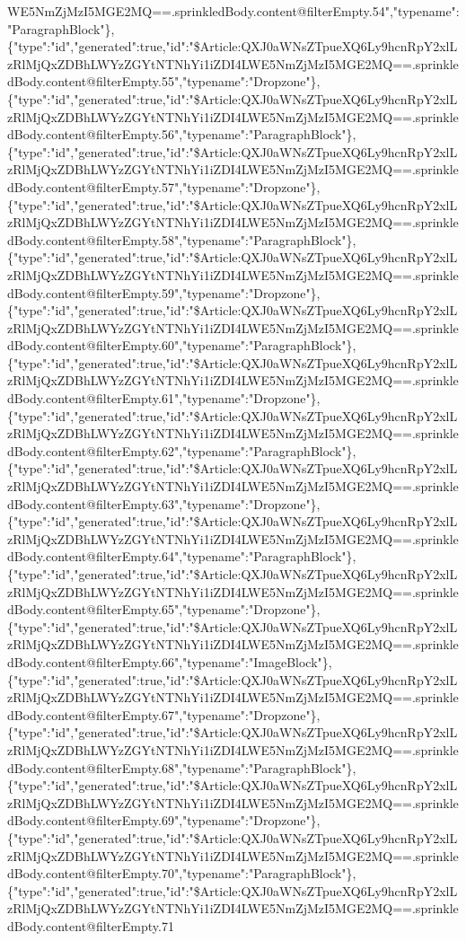 WE5NmZjMzI5MGE2MQ==.sprinkledBody.content@filterEmpty.54","typename":"ParagraphBlock"\},\{"type":"id","generated":true,"id":"\$Article:QXJ0aWNsZTpueXQ6Ly9hcnRpY2xlLzRlMjQxZDBhLWYzZGYtNTNhYi1iZDI4LWE5NmZjMzI5MGE2MQ==.sprinkledBody.content@filterEmpty.55","typename":"Dropzone"\},\{"type":"id","generated":true,"id":"\$Article:QXJ0aWNsZTpueXQ6Ly9hcnRpY2xlLzRlMjQxZDBhLWYzZGYtNTNhYi1iZDI4LWE5NmZjMzI5MGE2MQ==.sprinkledBody.content@filterEmpty.56","typename":"ParagraphBlock"\},\{"type":"id","generated":true,"id":"\$Article:QXJ0aWNsZTpueXQ6Ly9hcnRpY2xlLzRlMjQxZDBhLWYzZGYtNTNhYi1iZDI4LWE5NmZjMzI5MGE2MQ==.sprinkledBody.content@filterEmpty.57","typename":"Dropzone"\},\{"type":"id","generated":true,"id":"\$Article:QXJ0aWNsZTpueXQ6Ly9hcnRpY2xlLzRlMjQxZDBhLWYzZGYtNTNhYi1iZDI4LWE5NmZjMzI5MGE2MQ==.sprinkledBody.content@filterEmpty.58","typename":"ParagraphBlock"\},\{"type":"id","generated":true,"id":"\$Article:QXJ0aWNsZTpueXQ6Ly9hcnRpY2xlLzRlMjQxZDBhLWYzZGYtNTNhYi1iZDI4LWE5NmZjMzI5MGE2MQ==.sprinkledBody.content@filterEmpty.59","typename":"Dropzone"\},\{"type":"id","generated":true,"id":"\$Article:QXJ0aWNsZTpueXQ6Ly9hcnRpY2xlLzRlMjQxZDBhLWYzZGYtNTNhYi1iZDI4LWE5NmZjMzI5MGE2MQ==.sprinkledBody.content@filterEmpty.60","typename":"ParagraphBlock"\},\{"type":"id","generated":true,"id":"\$Article:QXJ0aWNsZTpueXQ6Ly9hcnRpY2xlLzRlMjQxZDBhLWYzZGYtNTNhYi1iZDI4LWE5NmZjMzI5MGE2MQ==.sprinkledBody.content@filterEmpty.61","typename":"Dropzone"\},\{"type":"id","generated":true,"id":"\$Article:QXJ0aWNsZTpueXQ6Ly9hcnRpY2xlLzRlMjQxZDBhLWYzZGYtNTNhYi1iZDI4LWE5NmZjMzI5MGE2MQ==.sprinkledBody.content@filterEmpty.62","typename":"ParagraphBlock"\},\{"type":"id","generated":true,"id":"\$Article:QXJ0aWNsZTpueXQ6Ly9hcnRpY2xlLzRlMjQxZDBhLWYzZGYtNTNhYi1iZDI4LWE5NmZjMzI5MGE2MQ==.sprinkledBody.content@filterEmpty.63","typename":"Dropzone"\},\{"type":"id","generated":true,"id":"\$Article:QXJ0aWNsZTpueXQ6Ly9hcnRpY2xlLzRlMjQxZDBhLWYzZGYtNTNhYi1iZDI4LWE5NmZjMzI5MGE2MQ==.sprinkledBody.content@filterEmpty.64","typename":"ParagraphBlock"\},\{"type":"id","generated":true,"id":"\$Article:QXJ0aWNsZTpueXQ6Ly9hcnRpY2xlLzRlMjQxZDBhLWYzZGYtNTNhYi1iZDI4LWE5NmZjMzI5MGE2MQ==.sprinkledBody.content@filterEmpty.65","typename":"Dropzone"\},\{"type":"id","generated":true,"id":"\$Article:QXJ0aWNsZTpueXQ6Ly9hcnRpY2xlLzRlMjQxZDBhLWYzZGYtNTNhYi1iZDI4LWE5NmZjMzI5MGE2MQ==.sprinkledBody.content@filterEmpty.66","typename":"ImageBlock"\},\{"type":"id","generated":true,"id":"\$Article:QXJ0aWNsZTpueXQ6Ly9hcnRpY2xlLzRlMjQxZDBhLWYzZGYtNTNhYi1iZDI4LWE5NmZjMzI5MGE2MQ==.sprinkledBody.content@filterEmpty.67","typename":"Dropzone"\},\{"type":"id","generated":true,"id":"\$Article:QXJ0aWNsZTpueXQ6Ly9hcnRpY2xlLzRlMjQxZDBhLWYzZGYtNTNhYi1iZDI4LWE5NmZjMzI5MGE2MQ==.sprinkledBody.content@filterEmpty.68","typename":"ParagraphBlock"\},\{"type":"id","generated":true,"id":"\$Article:QXJ0aWNsZTpueXQ6Ly9hcnRpY2xlLzRlMjQxZDBhLWYzZGYtNTNhYi1iZDI4LWE5NmZjMzI5MGE2MQ==.sprinkledBody.content@filterEmpty.69","typename":"Dropzone"\},\{"type":"id","generated":true,"id":"\$Article:QXJ0aWNsZTpueXQ6Ly9hcnRpY2xlLzRlMjQxZDBhLWYzZGYtNTNhYi1iZDI4LWE5NmZjMzI5MGE2MQ==.sprinkledBody.content@filterEmpty.70","typename":"ParagraphBlock"\},\{"type":"id","generated":true,"id":"\$Article:QXJ0aWNsZTpueXQ6Ly9hcnRpY2xlLzRlMjQxZDBhLWYzZGYtNTNhYi1iZDI4LWE5NmZjMzI5MGE2MQ==.sprinkledBody.content@filterEmpty.71
